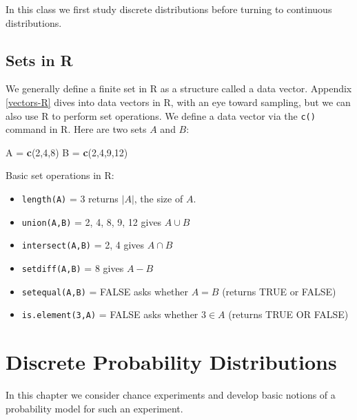 \documentclass[
]{book}
\newenvironment{Shaded}{\begin{snugshade}}{\end{snugshade}}
\newcommand{\DecValTok}[1]{\textcolor[rgb]{0.00,0.00,0.81}{#1}}
\newcommand{\FunctionTok}[1]{\textcolor[rgb]{0.13,0.29,0.53}{\textbf{#1}}}
\newcommand{\NormalTok}[1]{#1}
\newcommand{\OtherTok}[1]{\textcolor[rgb]{0.56,0.35,0.01}{#1}}
\providecommand{\tightlist}{%
  \setlength{\itemsep}{0pt}\setlength{\parskip}{0pt}}
\theoremstyle{definition}
\theoremstyle{definition}
\theoremstyle{definition}
\theoremstyle{definition}
\theoremstyle{remark}
\begin{document}
In this class we first study discrete distributions before turning to continuous distributions.

\section{Sets in R}\label{sets-in-r}

We generally define a finite set in R as a structure called a data vector. Appendix \ref{vectors-R} dives into data vectors in R, with an eye toward sampling, but we can also use R to perform set operations. We define a data vector via the \texttt{c()} command in R. Here are two sets \(A\) and \(B\):

\begin{Shaded}
\begin{Highlighting}[]
\NormalTok{A }\OtherTok{=} \FunctionTok{c}\NormalTok{(}\DecValTok{2}\NormalTok{,}\DecValTok{4}\NormalTok{,}\DecValTok{8}\NormalTok{)}
\NormalTok{B }\OtherTok{=} \FunctionTok{c}\NormalTok{(}\DecValTok{2}\NormalTok{,}\DecValTok{4}\NormalTok{,}\DecValTok{9}\NormalTok{,}\DecValTok{12}\NormalTok{)}
\end{Highlighting}
\end{Shaded}

Basic set operations in R:

\begin{itemize}
\tightlist
\item
  \texttt{length(A)} = 3 returns \(|A|\), the size of \(A\).
\item
  \texttt{union(A,B)} = 2, 4, 8, 9, 12 gives \(A \cup B\)
\item
  \texttt{intersect(A,B)} = 2, 4 gives \(A \cap B\)
\item
  \texttt{setdiff(A,B)} = 8 gives \(A - B\)
\item
  \texttt{setequal(A,B)} = FALSE asks whether \(A = B\) (returns TRUE or FALSE)
\item
  \texttt{is.element(3,A)} = FALSE asks whether \(3 \in A\) (returns TRUE OR FALSE)
\end{itemize}

\chapter{Discrete Probability Distributions}\label{discrete-probability-distributions}

In this chapter we consider chance experiments and develop basic notions of a probability model for such an experiment.
\end{document}
